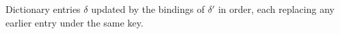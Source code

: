 Dictionary entries $\delta$ updated by the bindings of $\delta'$ in order, each replacing any earlier entry
under the same key.
